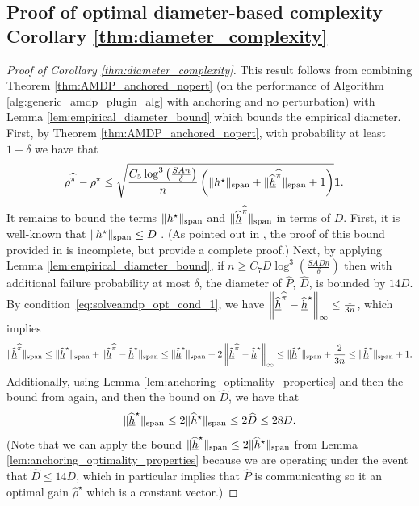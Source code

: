 \documentclass{article}
\theoremstyle{plain}
\theoremstyle{plain}
\theoremstyle{remark}
\theoremstyle{plain}
\theoremstyle{plain}
\newcommand{\Phat}{\widehat{P}}
\newcommand{\one}{\mathbf{1}}
\newcommand{\pihat}{\widehat{\pi}}
\newcommand{\rhohat}{\widehat{\rho}}
\newcommand{\hhat}{\widehat{h}}
\newcommand{\hhatanc}{\underline{\hhat}}
\begin{document}
\subsection{Proof of optimal diameter-based complexity Corollary \ref{thm:diameter_complexity}}
\label{sec:diam_complexity_thm_pf}
\begin{proof}[Proof of Corollary \ref{thm:diameter_complexity}]
    This result follows from combining Theorem \ref{thm:AMDP_anchored_nopert} (on the performance of Algorithm \ref{alg:generic_amdp_plugin_alg} with anchoring and no perturbation) with Lemma \ref{lem:empirical_diameter_bound} which bounds the empirical diameter. First, by Theorem \ref{thm:AMDP_anchored_nopert}, with probability at least $1 - \delta$ we have that
    \begin{align}
        \rho^{\pihat} - \rho^\star & \leq  \sqrt{\frac{C_5 \log^3 \left( \frac{SAn}{\delta} \right)}{n} \left( \spannorm{h^\star} + \spannorm{\hhatanc^{\pihat}} + 1 \right) }\one. \label{eq:diam_cor_1}
    \end{align}
    It remains to bound the terms $\Vert h^\star\Vert _{\textnormal{span}}$ and $\spannorm{\hhatanc^{\pihat}}$ in terms of $D$. First, it is well-known that $\Vert h^\star\Vert _{\textnormal{span}} \leq D$ \cite{bartlett_regal_2012}. (As pointed out in \cite[Exercise 38.13]{lattimore_bandit_2020}, the proof of this bound provided in \cite{bartlett_regal_2012} is incomplete, but \cite{lattimore_bandit_2020} provide a complete proof.) Next, by applying Lemma \ref{lem:empirical_diameter_bound}, if $n \geq C_7 D \log^3 \left(\frac{SADn}{\delta} \right)$ then with additional failure probability at most $\delta$, the diameter of $\Phat$, $\widehat{D}$, is bounded by $14 D$. By condition~\eqref{eq:solveamdp_opt_cond_1}, we have $\infnorm{\hhatanc^{\pihat} - \hhatanc^{\star}} \leq \frac{1}{3n}$, which implies
    \[
        \spannorm{\hhatanc^{\pihat}} \leq \spannorm{\hhatanc^{\star}} + \spannorm{\hhatanc^{\pihat} - \hhatanc^{\star}} \leq \spannorm{\hhatanc^{\star}} + 2\infnorm{\hhatanc^{\pihat} - \hhatanc^{\star}} \leq \spannorm{\hhatanc^{\star}} + \frac{2}{3n} \leq \spannorm{\hhatanc^{\star}} + 1.
    \]
    Additionally, using Lemma \ref{lem:anchoring_optimality_properties} and then the bound from \cite{bartlett_regal_2012} again, and then the bound on $\widehat{D}$, we have that
    \[
        \spannorm{\hhatanc^{\star}} \leq 2\spannorm{\hhat^\star} \leq 2 \widehat{D} \leq 28 D.
    \]
    (Note that we can apply the bound $\spannorm{\hhatanc^{\star}} \leq 2\spannorm{\hhat^\star}$ from Lemma \ref{lem:anchoring_optimality_properties} because we are operating under the event that $\widehat{D} \leq 14 D$, which in particular implies that $\Phat$ is communicating so it an optimal gain $\rhohat^\star$ which is a constant vector.)

\end{proof}
\end{document}
